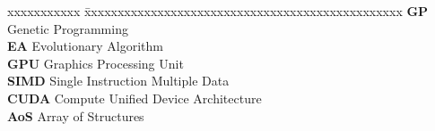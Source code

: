 \abbreviations
 
\noindent 
\begin{tabbing}
xxxxxxxxxxx \= xxxxxxxxxxxxxxxxxxxxxxxxxxxxxxxxxxxxxxxxxxxxxxxx \kill
\textbf{GP}   \> Genetic Programming \\
\textbf{EA}   \> Evolutionary Algorithm \\
\textbf{GPU}  \> Graphics Processing Unit \\
\textbf{SIMD} \> Single Instruction Multiple Data \\
\textbf{CUDA} \> Compute Unified Device Architecture \\
\textbf{AoS} \> Array of Structures
\end{tabbing}

